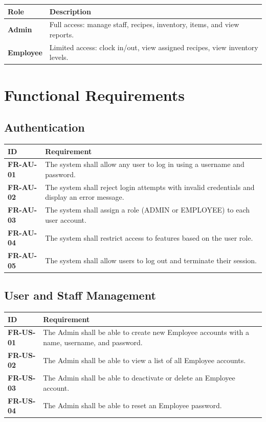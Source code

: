 \documentclass[12pt]{article}
\newcommand{\headerrow}{\rowcolor{darkblue}\color{white}\bfseries}
\begin{document}
\begin{tabularx}{\textwidth}{>{\bfseries}p{2.5cm} X}
\toprule
\headerrow Role & Description \\
\midrule
\rowcolor{lightgray} Admin    & Full access: manage staff, recipes, inventory, items, and view reports. \\
Employee & Limited access: clock in/out, view assigned recipes, view inventory levels. \\
\bottomrule
\end{tabularx}

\newpage

\section{Functional Requirements}

\subsection{Authentication}

\begin{longtable}{>{\bfseries}p{2cm} p{11cm}}
\toprule
\headerrow ID & Requirement \\
\midrule
\endhead
\rowcolor{lightgray} FR-AU-01 & The system shall allow any user to log in using a username and password. \\
FR-AU-02 & The system shall reject login attempts with invalid credentials and display an error message. \\
\rowcolor{lightgray} FR-AU-03 & The system shall assign a role (ADMIN or EMPLOYEE) to each user account. \\
FR-AU-04 & The system shall restrict access to features based on the user role. \\
\rowcolor{lightgray} FR-AU-05 & The system shall allow users to log out and terminate their session. \\
\bottomrule
\end{longtable}

\subsection{User and Staff Management}

\begin{longtable}{>{\bfseries}p{2cm} p{11cm}}
\toprule
\headerrow ID & Requirement \\
\midrule
\endhead
\rowcolor{lightgray} FR-US-01 & The Admin shall be able to create new Employee accounts with a name, username, and password. \\
FR-US-02 & The Admin shall be able to view a list of all Employee accounts. \\
\rowcolor{lightgray} FR-US-03 & The Admin shall be able to deactivate or delete an Employee account. \\
FR-US-04 & The Admin shall be able to reset an Employee password. \\
\bottomrule
\end{longtable}
\end{document}
